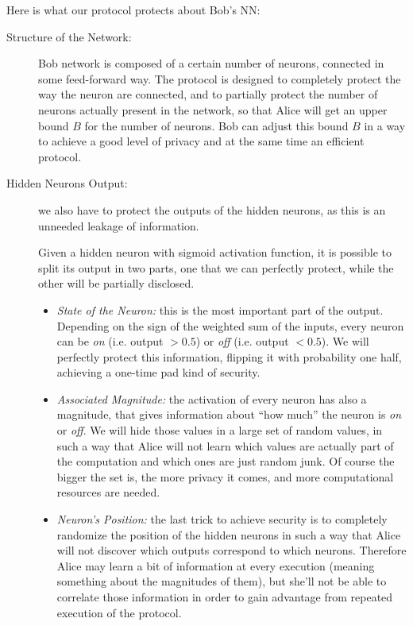 \documentclass[11pt,oribibl,runningheads]{llncs}
\begin{document}
Here is what our protocol protects about Bob's NN:
\begin{description}
    \item[Structure of the Network:] Bob network is composed of a
    certain number of neurons, connected in some feed-forward way.
    The protocol is designed to completely protect the way the neuron are
    connected, and to partially protect the number of neurons
    actually present in the network, so that Alice will get an upper bound $B$ for
    the number of neurons. Bob can adjust this bound $B$ in a way to
    achieve a good level of privacy and at the same time an
    efficient protocol.
    \item[Hidden Neurons Output:] we also have to protect the
    outputs of the hidden neurons, as this is an unneeded leakage of information.

    Given a hidden neuron with sigmoid activation
    function, it is possible to split its output in two parts,
    one that we can perfectly protect, while the other will be
    partially disclosed.
    \begin{itemize}
        \item {\em State of the Neuron:} this is the most important part of the output. Depending on the sign of
        the weighted sum of the inputs, every neuron can be {\em
        on}
        (i.e. output $>0.5$) or {\em off} (i.e. output $<0.5$). We
        will perfectly protect this information, flipping it with
        probability one half, achieving a one-time pad kind of security.
        \item {\em Associated Magnitude:} the activation of every
        neuron has also a magnitude, that gives information about
        ``how much'' the neuron is {\em on} or {\em off}. We will
hide those values in a large set of random values, in such a way that Alice will not learn
which values are actually part of the computation and which ones are just random junk. Of course the bigger
the set is, the more privacy it comes, and more computational resources are needed.
	\item {\em Neuron's Position:} the last trick to achieve security is to completely randomize the position of the hidden neurons in such a way that Alice will not discover which outputs correspond to which neurons. Therefore Alice may learn a bit of information at every execution (meaning something about the magnitudes of them), but she'll not be able to correlate those information in order to gain advantage from repeated execution of the protocol.
    \end{itemize}

\end{description}
\end{document}
